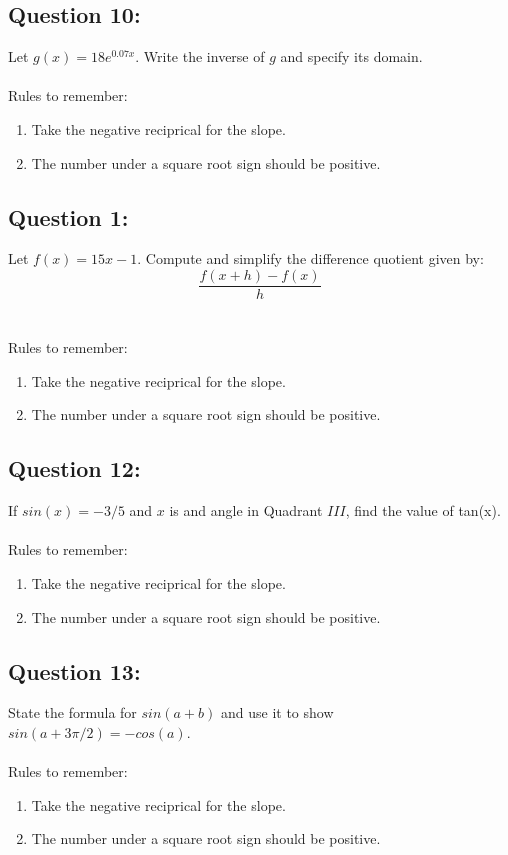 \documentclass[12pt, letterpaper]{article}
\begin{document}
\subsection{Question 10:}
  Let $g(x)=18e^{0.07x}$. Write the inverse of $g$ and specify its domain.
  \\\\
  Rules to remember:
  \begin{enumerate}
    \item Take the negative reciprical for the slope.
    \item The number under a square root sign should be positive.
  \end{enumerate}

\subsection{Question 1:}
  Let $f(x)=15x-1$. Compute and simplify the difference quotient given by:
  $$\frac{f(x+h)-f(x)}{h}$$
  \\\\
  Rules to remember:
  \begin{enumerate}
    \item Take the negative reciprical for the slope.

    \item The number under a square root sign should be positive.
  \end{enumerate}

\subsection{Question 12:}
  If $sin(x) = -3/5$ and $x$ is and angle in Quadrant $III$, 
  find the value of tan(x). 
  \\\\
  Rules to remember:
  \begin{enumerate}
    \item Take the negative reciprical for the slope.
    \item The number under a square root sign should be positive.
  \end{enumerate}

\subsection{Question 13:}
  State the formula for $sin(a+b)$ and use it to show $sin(a+3\pi/2)=-cos(a)$.
  \\\\
  Rules to remember:
  \begin{enumerate}
    \item Take the negative reciprical for the slope.
    \item The number under a square root sign should be positive.
  \end{enumerate}
\end{document}
